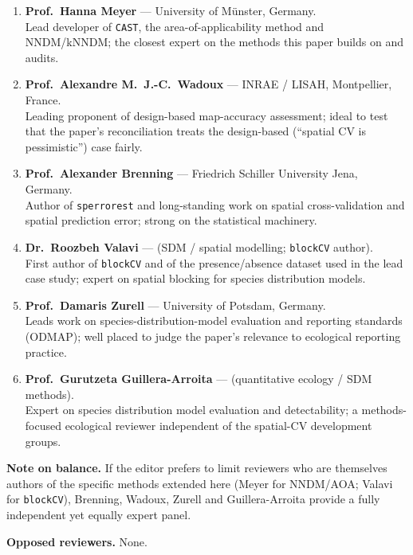 \documentclass[11pt,a4paper]{article}
\begin{document}
\begin{enumerate}[leftmargin=1.4em,itemsep=6pt]
\item \textbf{Prof.\ Hanna Meyer} --- University of M\"unster, Germany.\\
Lead developer of \texttt{CAST}, the area-of-applicability method and NNDM/kNNDM;
the closest expert on the methods this paper builds on and audits.

\item \textbf{Prof.\ Alexandre M.\ J.-C.\ Wadoux} --- INRAE / LISAH, Montpellier,
France.\\
Leading proponent of design-based map-accuracy assessment; ideal to test that the
paper's reconciliation treats the design-based (``spatial CV is pessimistic'') case
fairly.

\item \textbf{Prof.\ Alexander Brenning} --- Friedrich Schiller University Jena,
Germany.\\
Author of \texttt{sperrorest} and long-standing work on spatial cross-validation and
spatial prediction error; strong on the statistical machinery.

\item \textbf{Dr.\ Roozbeh Valavi} --- (SDM / spatial modelling; \texttt{blockCV}
author).\\
First author of \texttt{blockCV} and of the presence/absence dataset used in the lead
case study; expert on spatial blocking for species distribution models.

\item \textbf{Prof.\ Damaris Zurell} --- University of Potsdam, Germany.\\
Leads work on species-distribution-model evaluation and reporting standards (ODMAP);
well placed to judge the paper's relevance to ecological reporting practice.

\item \textbf{Prof.\ Gurutzeta Guillera-Arroita} --- (quantitative ecology / SDM
methods).\\
Expert on species distribution model evaluation and detectability; a methods-focused
ecological reviewer independent of the spatial-CV development groups.
\end{enumerate}

\textbf{Note on balance.} If the editor prefers to limit reviewers who are themselves
authors of the specific methods extended here (Meyer for NNDM/AOA; Valavi for
\texttt{blockCV}), Brenning, Wadoux, Zurell and Guillera-Arroita provide a
fully independent yet equally expert panel.

\medskip
\textbf{Opposed reviewers.} None.
\end{document}
